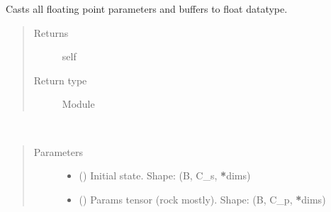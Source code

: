 \documentclass[letterpaper,10pt,english]{sphinxmanual}
\begin{document}
\begin{fulllineitems}

\begin{fulllineitems}
\label{\detokenize{api/dynamics:geology.metamodelling.dynamics.NeuralDifferentialEquation.float}}
Casts all floating point parameters and buffers to float datatype.
\begin{quote}\begin{description}
\item[{Returns}] \leavevmode
self

\item[{Return type}] \leavevmode
Module

\end{description}\end{quote}

\end{fulllineitems}


\begin{fulllineitems}
\label{\detokenize{api/dynamics:geology.metamodelling.dynamics.NeuralDifferentialEquation.forward}}~\begin{quote}\begin{description}
\item[{Parameters}] \leavevmode\begin{itemize}
\item {} 
 () \textendash{} Initial state. Shape: (B, C\_s, {\color{red}\bfseries{}*}dims)

\item {} 
 () \textendash{} Params tensor (rock mostly). Shape: (B, C\_p, {\color{red}\bfseries{}*}dims)


\end{itemize}
\end{description}
\end{quote}
\end{fulllineitems}
\end{fulllineitems}
\end{document}
